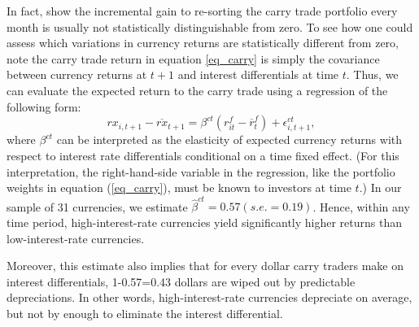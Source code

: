 \documentclass{ar-1col}
\begin{document}
In fact, \citet{HassanMano2019} show the incremental gain to re-sorting the carry trade portfolio every month is usually not statistically distinguishable from zero. To see how one could assess which variations in currency returns are statistically different from zero, note the carry trade return in equation \ref{eq_carry} is simply the covariance between currency returns at $t+1$ and interest differentials at time $t$. Thus, we can evaluate the expected return to the carry trade using a regression of the following form:
\begin{equation}
    rx_{i,t+1} - \overline{rx}_{t+1} 
    = \beta^{ct}\left( r^f_{it}-\overline{r}^f_{t}\right) +\epsilon_{i,t+1}^{ct},  \label{eq_ct}
\end{equation} 
where $\beta ^{ct}$ can be interpreted as the elasticity of expected currency returns with respect to interest rate differentials conditional on a time fixed effect. (For this interpretation, the right-hand-side variable in the regression, like the portfolio weights in equation (\ref{eq_carry}), must be known to investors at time $t$.) In our sample of 31 currencies, we estimate $\hat{\beta}^{ct}=0.57 (s.e.=0.19)$. Hence, within any time period, high-interest-rate currencies yield significantly higher returns than low-interest-rate currencies.

Moreover, this estimate also implies that for every dollar carry traders make on interest differentials, 1-0.57=0.43 dollars are wiped out by predictable depreciations. In other words, high-interest-rate currencies depreciate on average, but not by enough to eliminate the interest differential.
\end{document}
